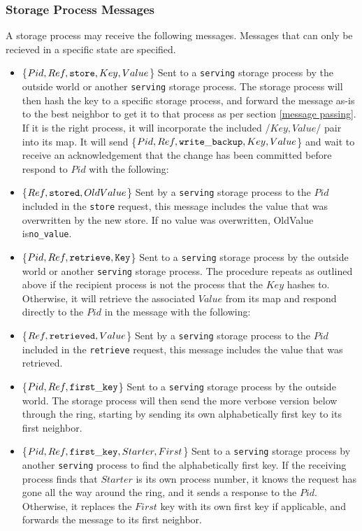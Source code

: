 \documentclass[a4paper]{article}
\begin{document}
\subsubsection{Storage Process Messages}

A storage process may receive the following messages. Messages that can only be recieved in a specific state are specified.

\begin{itemize}
	\item\{$Pid, Ref, {\tt store}, Key, Value$\} Sent to a {\tt serving} storage process by the outside world or another {\tt serving} storage process. The storage process will then hash the key to a specific storage process, and forward the message as-is to the best neighbor to get it to that process as per section \ref{message passing}. If it is the right process, it will incorporate the included /{$Key, Value$/} pair into its map. It will send \{$Pid, Ref, {\tt write\_backup}, Key, Value$\} and wait to receive an acknowledgement that the change has been committed before respond to $Pid$ with the following:
\item\{$Ref, {\tt stored}, OldValue$\} Sent by a {\tt serving} storage process to the $Pid$ included in the {\tt store} request, this message includes the value that was overwritten by the new store. If no value was overwritten, OldValue is{\tt no\_value}.
\item\{$Pid, Ref, {\tt retrieve, Key}$\} Sent to a {\tt serving} storage process by the outside world or another {\tt serving} storage process. The procedure repeats as outlined above if the recipient process is not the process that the $Key$ hashes to. Otherwise, it will retrieve the associated $Value$ from its map and respond directly to the $Pid$ in the message with the following:
\item\{$Ref, {\tt retrieved}, Value$\} Sent by a {\tt serving} storage process to the $Pid$ included in the {\tt retrieve} request, this message includes the value that was retrieved.
\item\{$Pid, Ref, {\tt first\_key}$\} Sent to a {\tt serving} storage process by the outside world. The storage process will then send the more verbose version below through the ring, starting by sending its own alphabetically first key to its first neighbor.
\item\{$Pid, Ref, {\tt first\_key}, Starter, First$\} Sent to a {\tt serving} storage process by another {\tt serving} process to find the alphabetically first key. If the receiving process finds that $Starter$ is its own process number, it knows the request has gone all the way around the ring, and it sends a response to the $Pid$. Otherwise, it replaces the $First$ key with its own first key if applicable, and forwards the message to its first neighbor.

\end{itemize}
\end{document}
